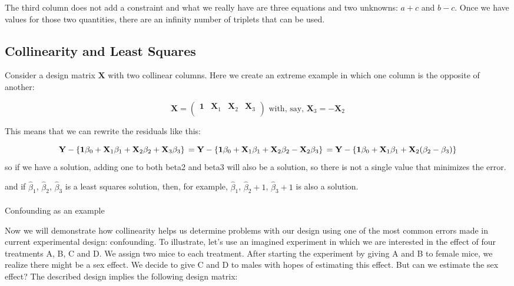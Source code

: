 \documentclass[
  letterpaper,
  DIV=11,
  numbers=noendperiod]{scrartcl}
\makeatletter
\let\oldparagraph\paragraph
\renewcommand{\paragraph}{
    \@ifstar
      \xxxParagraphStar
      \xxxParagraphNoStar
  }
\newcommand{\xxxParagraphStar}[1]{\oldparagraph*{#1}\mbox{}}
\newcommand{\xxxParagraphNoStar}[1]{\oldparagraph{#1}\mbox{}}
\makeatother
\begin{document}
The third column does not add a constraint and what we really have are
three equations and two unknowns: \(a+c\) and \(b-c\). Once we have
values for those two quantities, there are an infinity number of
triplets that can be used.

\subsection{Collinearity and Least
Squares}\label{collinearity-and-least-squares}

Consider a design matrix \(\mathbf{X}\) with two collinear columns. Here
we create an extreme example in which one column is the opposite of
another:

\[
\mathbf{X} = \begin{pmatrix}
\mathbf{1}&\mathbf{X}_1&\mathbf{X}_2&\mathbf{X}_3\\
\end{pmatrix}
\mbox{ with, say, }
\mathbf{X}_3 = - \mathbf{X}_2
\]

This means that we can rewrite the residuals like this:

\[
\mathbf{Y}- \left\{ \mathbf{1}\beta_0 + \mathbf{X}_1\beta_1 + \mathbf{X}_2\beta_2 + \mathbf{X}_3\beta_3\right\}\\ 
= \mathbf{Y}- \left\{ \mathbf{1}\beta_0 + \mathbf{X}_1\beta_1 + \mathbf{X}_2\beta_2 - \mathbf{X}_2\beta_3\right\}\\
= \mathbf{Y}- \left\{\mathbf{1}\beta_0 + \mathbf{X}_1 \beta_1 + \mathbf{X}_2(\beta_2  - \beta_3)\right\}
\] so if we have a solution, adding one to both beta2 and beta3 will
also be a solution, so there is not a single value that minimizes the
error.

and if \(\hat{\beta}_1\), \(\hat{\beta}_2\), \(\hat{\beta}_3\) is a
least squares solution, then, for example, \(\hat{\beta}_1\),
\(\hat{\beta}_2+1\), \(\hat{\beta}_3+1\) is also a solution.

\paragraph{Confounding as an example}\label{confounding-as-an-example}

Now we will demonstrate how collinearity helps us determine problems
with our design using one of the most common errors made in current
experimental design: confounding. To illustrate, let's use an imagined
experiment in which we are interested in the effect of four treatments
A, B, C and D. We assign two mice to each treatment. After starting the
experiment by giving A and B to female mice, we realize there might be a
sex effect. We decide to give C and D to males with hopes of estimating
this effect. But can we estimate the sex effect? The described design
implies the following design matrix:
\end{document}
